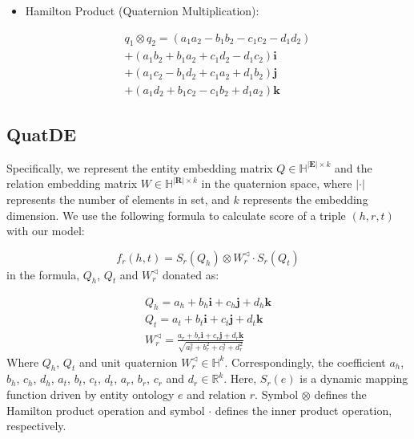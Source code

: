 \documentclass[letterpaper]{article} \usepackage{aaai20}  \usepackage{times}  \usepackage{helvet} \usepackage{courier}  \usepackage[hyphens]{url}  \usepackage{graphicx} \usepackage{lineno,hyperref,amsmath,amssymb}
\begin{document}
\begin{itemize}
\item Hamilton Product (Quaternion Multiplication):

\begin{equation}
\begin{aligned}
q_{1} \otimes q_{2}=\left(a_{1} a_{2}-b_{1} b_{2}-c_{1} c_{2}-d_{1} d_{2}\right) \\
+\left(a_{1} b_{2}+b_{1} a_{2}+c_{1} d_{2}-d_{1} c_{2}\right) \mathbf{i} \\
+\left(a_{1} c_{2}-b_{1} d_{2}+c_{1} a_{2}+d_{1} b_{2}\right) \mathbf{j} \\
+\left(a_{1} d_{2}+b_{1} c_{2}-c_{1} b_{2}+d_{1} a_{2}\right) \mathbf{k}
\end{aligned}
\end{equation}

\end{itemize}

\subsection{QuatDE}

Specifically, we represent the entity embedding matrix $Q \in \mathbb{H}^{ |\boldsymbol{E}| \times k}$ and the relation embedding matrix $W \in \mathbb{H}^{ |\boldsymbol{R}| \times k}$ in the quaternion space, where $|\cdot|$ represents the number of elements in set, and $k$ represents the embedding dimension. We use the following formula to calculate score of a triple $(h,r,t)$ with our model:

\begin{equation}
f_{r}(h, t)=S_{r}\left(Q_{h}\right) \otimes W_{r}^{\triangleleft} \cdot S_{r}\left(Q_{t}\right)
\end{equation}in the formula, $Q_h$, $Q_t$ and $W_r^{\triangleleft}$ donated as:

\begin{equation}
\begin{array}{l}
Q_{h}=a_{h}+b_{h} \mathbf{i}+c_{h} \mathbf{j}+d_{h} \mathbf{k} \\
Q_{t}=a_{t}+b_{t} \mathbf{i}+c_{t} \mathbf{j}+d_{t} \mathbf{k} \\
W_{r}^{\triangleleft}=\frac{a_{r}+b_{r} \mathbf{i}+c_{r} \mathbf{j}+d_{r} \mathbf{k}}{\sqrt{a_{r}^{2}+b_{r}^{2}+c_{r}^{2}+d_{r}^{2}}}
\end{array}
\end{equation}Where $Q_h$, $Q_t$ and unit quaternion $W_r^ {\triangleleft} \in \mathbb{H}^k$. Correspondingly, the coefficient $a_h$, $b_h$, $c_h$, $d_h$, $a_t$, $b_t$, $c_t$, $d_t$, $a_r$, $b_r$, $c_r$ and  $d_r \in \mathbb{R}^k.$ Here, $S_r (e)$ is a dynamic mapping function driven by entity ontology $e$ and relation $r$. Symbol $ \otimes $ defines the Hamilton product operation and symbol $\cdot$ defines the inner product operation, respectively.
\end{document}
